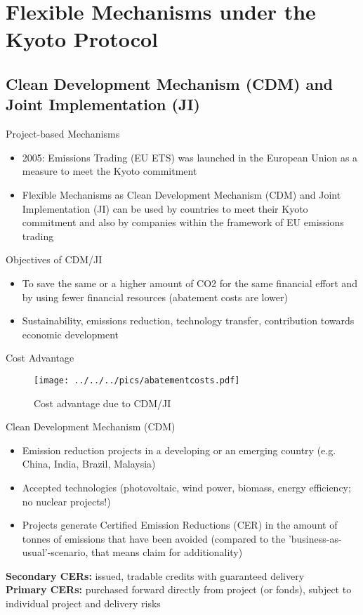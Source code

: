 \section{Flexible Mechanisms under the Kyoto Protocol}
\subsection{Clean Development Mechanism (CDM) and Joint Implementation (JI)}

{Project-based Mechanisms}
\begin{itemize}
\item<1-> 2005:  Emissions Trading (EU ETS) was launched in the European Union as a measure to meet the Kyoto commitment
\item<2-> Flexible Mechanisms as Clean Development Mechanism (CDM) and Joint Implementation (JI) can be used by countries to meet their Kyoto commitment and also by companies within the framework of EU emissions trading
\end{itemize}
Objectives of CDM/JI
\begin{itemize}
\item<1-> To save the same or a higher amount of CO2 for the same financial effort and by using fewer financial resources (abatement costs are lower)
\item<2-> Sustainability, emissions reduction, technology transfer, contribution towards economic development
 \end{itemize}





{Cost Advantage}
\begin{figure}[h!]
\centering
\texttt{[image: ../../../pics/abatementcosts.pdf]}
\caption{Cost advantage due to CDM/JI}
\label{fig:CDM/JI}
\end{figure}




{Clean Development Mechanism (CDM)}
\begin{itemize}
\item <1-> Emission reduction projects in a developing or an emerging country (e.g. China, India, Brazil, Malaysia)
\item <2-> Accepted technologies (photovoltaic, wind power, biomass, energy efficiency; no nuclear projects!)
\item <3-> Projects generate Certified Emission Reductions (CER) in the amount of tonnes of emissions that have been avoided (compared to the 'business-as-usual'-scenario, that means claim for additionality)
\end{itemize}
\textbf{Secondary CERs:} issued, tradable credits with guaranteed delivery \\
\textbf{Primary CERs:} purchased forward directly from project (or fonds), subject to individual project and delivery risks


